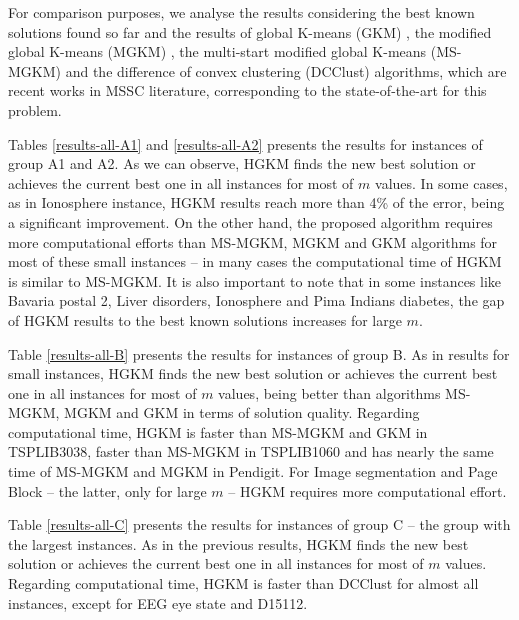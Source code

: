For comparison purposes, we analyse the results considering the best known solutions found so far and the results of global K-means (GKM) \cite{Likas2003}, the modified global K-means (MGKM) \cite{Bagirov2008}, the multi-start modified global K-means (MS-MGKM) \cite{Ordin2014} and the difference of convex clustering (DCClust) \cite{Bagirov2016} algorithms, which are recent works in MSSC literature, corresponding to the state-of-the-art for this problem.

Tables \ref{results-all-A1} and \ref{results-all-A2} presents the results for instances of group A1 and A2. As we can observe, HGKM finds the new best solution or achieves the current best one in all instances for most of $m$ values. In some cases, as in Ionosphere instance, HGKM results reach more than 4\% of the error, being a significant improvement. On the other hand, the proposed algorithm requires more computational efforts than MS-MGKM, MGKM and GKM algorithms for most of these small instances -- in many cases the computational time of HGKM is similar to MS-MGKM. It is also important to note that in some instances like Bavaria postal 2, Liver disorders, Ionosphere and Pima Indians diabetes, the gap of HGKM results to the best known solutions increases for large $m$.

Table \ref{results-all-B} presents the results for instances of group B. As in results for small instances, HGKM finds the new best solution or achieves the current best one in all instances for most of $m$ values, being better than algorithms MS-MGKM, MGKM and GKM in terms of solution quality. Regarding computational time, HGKM is faster than MS-MGKM and GKM in TSPLIB3038, faster than MS-MGKM in TSPLIB1060 and has nearly the same time of MS-MGKM and MGKM in Pendigit. For Image segmentation and Page Block -- the latter, only for large $m$ -- HGKM requires more computational effort.

Table \ref{results-all-C} presents the results for instances of group C -- the group with the largest instances. As in the previous results, HGKM finds the new best solution or achieves the current best one in all instances for most of $m$ values. Regarding computational time, HGKM is faster than DCClust for almost all instances, except for EEG eye state and D15112.







